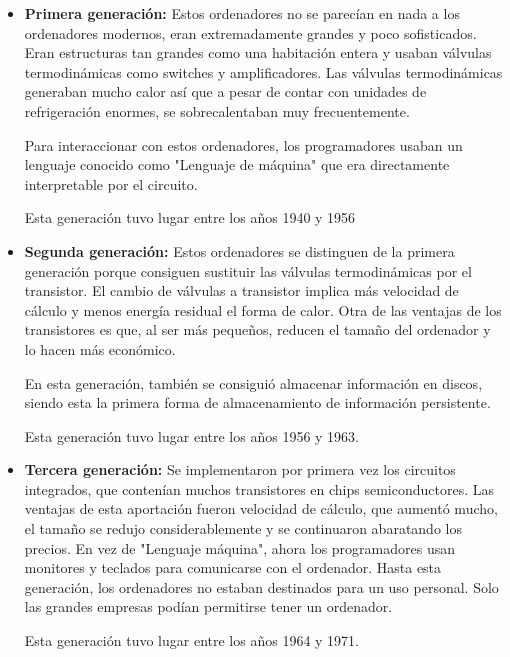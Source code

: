 \documentclass[titlepage, 12pt, a4paper]{article}
\begin{document}
\begin{itemize}
	\item{\textbf{Primera generación: }}Estos ordenadores no se parecían en nada a los ordenadores modernos, eran extremadamente grandes y poco sofisticados. Eran estructuras tan grandes como una habitación entera y usaban válvulas termodinámicas como switches y amplificadores. Las válvulas termodinámicas generaban mucho calor así que a pesar de contar con unidades de refrigeración enormes, se sobrecalentaban muy frecuentemente.\par Para interaccionar con estos ordenadores, los programadores usaban un lenguaje conocido como "Lenguaje de máquina" que era directamente interpretable por el circuito.\par Esta generación tuvo lugar entre los años 1940 y 1956
	\item{\textbf{Segunda generación: }}Estos ordenadores se distinguen de la primera generación porque consiguen sustituir las válvulas termodinámicas por el  transistor. El cambio de válvulas a transistor implica más velocidad de cálculo y menos energía residual el forma de calor. Otra de las ventajas de los transistores es que, al ser más pequeños, reducen el tamaño del ordenador y lo hacen más económico.\par En esta generación, también se consiguió almacenar información en discos, siendo esta la primera forma de almacenamiento de información persistente.\par Esta generación tuvo lugar entre los años 1956 y 1963.
	\item{\textbf{Tercera generación: }}Se implementaron por primera vez los circuitos integrados, que contenían muchos transistores en chips semiconductores. Las ventajas de esta aportación fueron velocidad de cálculo, que aumentó mucho, el tamaño se redujo considerablemente y se continuaron abaratando los precios. En vez de "Lenguaje máquina", ahora los programadores usan monitores y teclados para comunicarse con el ordenador. Hasta esta generación, los ordenadores no estaban destinados para un uso personal. Solo las grandes empresas podían permitirse tener un ordenador.\par Esta generación tuvo lugar entre los años 1964 y 1971.

\end{itemize}
\end{document}
